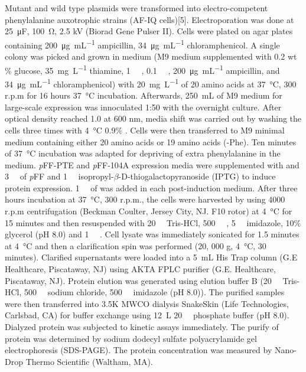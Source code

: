\begin{refsection}
Mutant and wild type plasmids were transformed into electro-competent  phenylalanine auxotrophic strains (AF-IQ cells)[5]. Electroporation was
done at \SI{25}{\micro\farad}, \SI{100}{\ohm}, 2.5 kV (Biorad Gene Pulser II).
Cells were plated on agar plates containing \SI{200}{\ug\per\mL} ampicillin,
\SI{34}{\ug\per\mL} chloramphenicol. A single colony was picked and grown in
medium (M9 medium supplemented with 0.2 wt \% glucose, \SI{35}{\mg\per\L}
thiamine, \SI{1}{\milli\Molar} , \SI{0.1}{\milli\Molar} ,
\SI{200}{\ug\per\mL} ampicillin, and \SI{34}{\ug\per\mL} chloramphenicol) with
\SI{20}{\mg\per\L} of 20 amino acids at \SI{37}{\celsius}, 300 r.p.m for 16
hours \SI{37}{\celsius} incubation.  Afterwards, \SI{250}{\mL} of M9 medium for
large-scale expression was innoculated 1:50 with the overnight culture.  After
optical density reached 1.0 at 600 nm, media shift was carried out by washing
the cells three times with \SI{4}{\celsius} 0.9\% . Cells were then
transferred to M9 minimal medium containing either 20 amino acids or 19 amino
acids (-Phe). Ten minutes of \SI{37}{\celsius} incubation was adapted for
depriving of extra phenylalanine in the medium. \emph{p}FF-PTE and
\emph{p}FF-104A expression media were supplemented with and
\SI{3}{\milli\Molar} of \emph{p}FF and \SI{1}{\milli\Molar}
isopropyl-$\beta$-D-thiogalactopyranoside (IPTG) to induce protein expression.
\SI{1}{\milli\Molar} of  was added in each post-induction medium.
After three hours incubation at \SI{37}{\celsius}, 300 r.p.m., the cells were
harvested by using 4000 r.p.m centrifugation (Beckman Coulter, Jersey City, NJ.
F10 rotor) at \SI{4}{\celsius} for 15 minutes and then resuspended with
\SI{20}{\milli\Molar} Tris-HCl, \SI{500}{\milli\Molar} ,
\SI{5}{\milli\Molar} imidazole, 10\% glycerol (pH 8.0) and \SI{1}{\micro\Molar}
. Cell lysate was immediately sonicated for 1.5 minutes at
\SI{4}{\celsius} and then a clarification spin was performed (20, 000 g,
\SI{4}{\celsius}, 30 minutes).  Clarified supernatants were loaded into a
\SI{5}{\mL} His Trap column (G.E Healthcare, Piscataway, NJ) using AKTA FPLC
purifier (G.E.  Healthcare, Piscataway, NJ).  Protein elution was generated
using elution buffer B (\SI{20}{\milli\Molar} Tris-HCl, \SI{500}{\milli\Molar}
sodium chloride, \SI{500}{\milli\Molar} imidazole (pH 8.0)).  The purified
samples were then transferred into 3.5K MWCO dialysis SnakeSkin (Life
Technologies, Carlsbad, CA) for buffer exchange using \SI{12}{\L}
\SI{20}{\milli\Molar} phosphate buffer (pH 8.0).  Dialyzed protein was
subjected to kinetic assays immediately. The purify of protein was determined
by sodium dodecyl sulfate polyacrylamide gel electrophoresis (SDS-PAGE). The
protein concentration was measured by Nano-Drop Thermo
Scientific (Waltham, MA). 


\end{refsection}
